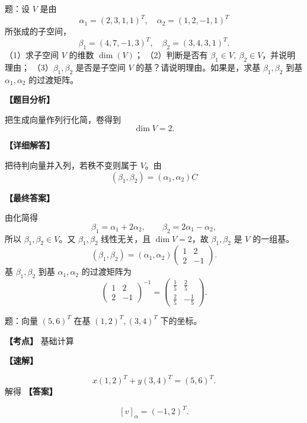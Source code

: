 ﻿\documentclass[11pt,a4paper,UTF8]{ctexart}
\begin{document}
\begin{answerbox}
题：设 $V$ 是由
\[
\alpha_1=(2,3,1,1)^T,\quad \alpha_2=(1,2,-1,1)^T
\]
所张成的子空间，
\[
\beta_1=(4,7,-1,3)^T,\quad \beta_2=(3,4,3,1)^T.
\]
（1）求子空间 $V$ 的维数 $\dim(V)$；
（2）判断是否有 $\beta_1\in V,\ \beta_2\in V$，并说明理由；
（3）$\beta_1,\beta_2$ 是否是子空间 $V$ 的基？请说明理由。如果是，求基 $\beta_1,\beta_2$ 到基 $\alpha_1,\alpha_2$ 的过渡矩阵。

\textbf{【题目分析】}

把生成向量作列行化简，卷得到
\[\dim V=2.\]

\textbf{【详细解答】}

把待判向量并入列，若秩不变则属于 $V$。由
\[(\beta_1,\beta_2)=(\alpha_1,\alpha_2)C\]

\textbf{【最终答案】}

由化简得
\[
\beta_1=\alpha_1+2\alpha_2,\qquad \beta_2=2\alpha_1-\alpha_2,
\]
所以 \(\beta_1,\beta_2\in V\)。又 \(\beta_1,\beta_2\) 线性无关，且 \(\dim V=2\)，故 \(\beta_1,\beta_2\) 是 \(V\) 的一组基。
\[
(\beta_1,\beta_2)=(\alpha_1,\alpha_2)
\begin{pmatrix}
1&2\\
2&-1
\end{pmatrix}.
\]
基 \(\beta_1,\beta_2\) 到基 \(\alpha_1,\alpha_2\) 的过渡矩阵为
\[
\begin{pmatrix}
1&2\\
2&-1
\end{pmatrix}^{-1}
=
\begin{pmatrix}
\frac15&\frac25\\
\frac25&-\frac15
\end{pmatrix}.
\]
\end{answerbox}
\begin{answerbox}[2021--2022 填空 5]
题：向量 $(5,6)^T$ 在基 $(1,2)^T,(3,4)^T$ 下的坐标。

\textbf{【考点】} 基础计算

\textbf{【速解】}

\[x(1,2)^T+y(3,4)^T=(5,6)^T.\]
解得
\textbf{【答案】}

\[[v]_{\alpha}=(-1,2)^T.\]
\end{answerbox}
\end{document}
